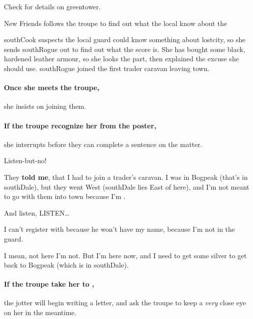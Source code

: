 Check  for details on \gls{greentower}.

{New Friends}%
{ follows the troupe to find out what the local  know about the }%

\Gls{southCook} suspects the local \gls{guard} could know something about \gls{lostcity}, so she sends \gls{southRogue} out to find out what the score is.
She has bought  some black, hardened leather armour, so she looks the part, then explained the excuse she should use.
\Gls{southRogue} joined the first trader caravan leaving \gls{town}.

\paragraph{Once she meets the troupe,}
she insists on joining them.

\paragraph{If the troupe recognize her from the poster,}
she interrupts before they can complete a sentence on the matter.

\begin{exampletext}
  Listen-but-no!
  
  They \textbf {told me}, that I had to join a trader's caravan.
  I was in Bogpeak (that's in \gls{southDale}), but they went West (\gls{southDale} lies East of here), and I'm not meant to go with them into \gls{town} because I'm .
  
  And listen, LISTEN\ldots

  I can't register with  because he won't have my name, because I'm not in the \gls{guard}.

  I mean, not here I'm not.
  But I'm here now, and I need to get some silver to get back to Bogpeak (which is in \gls{southDale}).
\end{exampletext}

\paragraph{If the troupe take her to ,}
the \gls{jotter} will begin writing a letter, and ask the troupe to keep a \textit{very} close eye on her in the meantime.

\southRogue %
\label{southRogue}

